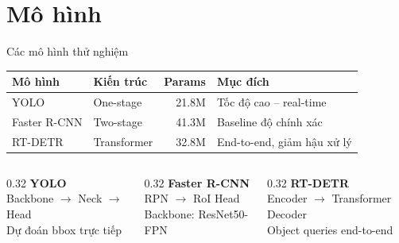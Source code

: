 \section{Mô hình}

\begin{frame}{Các mô hình thử nghiệm}

\begin{table}
\small
\begin{tabular}{l l r l}
  \toprule
  \textbf{Mô hình} & \textbf{Kiến trúc} & \textbf{Params} & \textbf{Mục đích} \\
  \midrule
  YOLO        & One-stage   & 21.8M & Tốc độ cao -- real-time \\
  Faster R-CNN & Two-stage  & 41.3M & Baseline độ chính xác \\
  RT-DETR     & Transformer & 32.8M & End-to-end, giảm hậu xử lý \\
  \bottomrule
\end{tabular}
\end{table}

\vspace{0.4em}
\begin{columns}[T]
\begin{column}{0.32\textwidth}
  \textbf{YOLO}\\
  Backbone $\to$ Neck $\to$ Head\\
  Dự đoán bbox trực tiếp
\end{column}
\begin{column}{0.32\textwidth}
  \textbf{Faster R-CNN}\\
  RPN $\to$ RoI Head\\
  Backbone: ResNet50-FPN
\end{column}
\begin{column}{0.32\textwidth}
  \textbf{RT-DETR}\\
  Encoder $\to$ Transformer Decoder\\
  Object queries end-to-end
\end{column}
\end{columns}

\end{frame}

